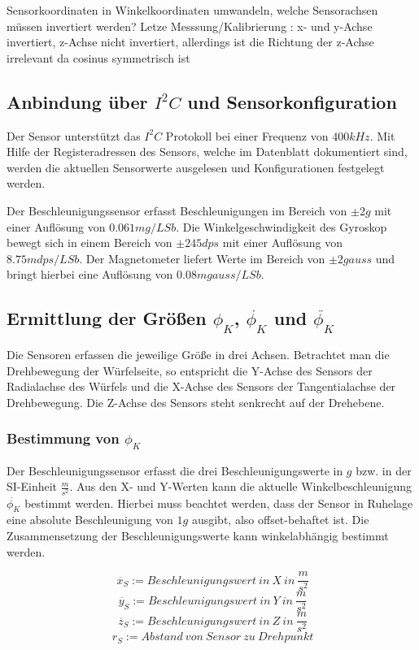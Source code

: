 \documentclass{article}
\begin{document}
Sensorkoordinaten in Winkelkoordinaten umwandeln, welche Sensorachsen müssen invertiert werden?
Letze Messsung/Kalibrierung : x- und y-Achse invertiert, z-Achse nicht invertiert, allerdings ist die Richtung der z-Achse irrelevant da cosinus symmetrisch ist

\subsection{Anbindung über $I^2C$ und Sensorkonfiguration}
Der Sensor unterstützt das $I^2C$ Protokoll bei einer Frequenz von $400k Hz$. Mit Hilfe der Registeradressen des Sensors, welche im Datenblatt dokumentiert sind, werden die aktuellen Sensorwerte ausgelesen und Konfigurationen festgelegt werden.

Der Beschleunigungssensor erfasst Beschleunigungen im Bereich von $\pm2 g$ mit einer Auflösung von $0.061 mg / LSb$. Die Winkelgeschwindigkeit des Gyroskop bewegt sich in einem Bereich von $\pm 245 dps$ mit einer Auflösung von $8.75 mdps / LSb$. Der Magnetometer liefert Werte im Bereich von $\pm 2gauss$ und bringt hierbei eine Auflösung von $0.08 mgauss / LSb$.

\subsection{Ermittlung der Größen $\phi_K$, $\dot{\phi_K}$ und $\ddot{\phi_K}$}
Die Sensoren erfassen die jeweilige Größe in drei Achsen. Betrachtet man die Drehbewegung der Würfelseite, so entspricht die Y-Achse des Sensors der Radialachse des Würfels und die X-Achse des Sensors der Tangentialachse der Drehbewegung. Die Z-Achse des Sensors steht senkrecht auf der Drehebene.

\subsubsection{Bestimmung von $\phi_K$}
Der Beschleunigungssensor erfasst die drei Beschleunigungswerte in $g$ bzw. in der SI-Einheit $\frac{m}{s^2}$. Aus den X- und Y-Werten kann die aktuelle Winkelbeschleunigung $\ddot{\phi_K}$ bestimmt werden. Hierbei muss beachtet werden, dass der Sensor in Ruhelage eine absolute Beschleunigung von $1g$ ausgibt, also offset-behaftet ist. Die Zusammensetzung der Beschleunigungswerte kann winkelabhängig bestimmt werden.

\[\ \ddot{x_S} := Beschleunigungswert \ in \ X \ in \ \frac{m}{s^2} \]
\[\ \ddot{y_S} := Beschleunigungswert \ in \ Y \ in \ \frac{m}{s^2} \]
\[\ \ddot{z_S} := Beschleunigungswert \ in \ Z \ in \ \frac{m}{s^2} \]
\[\ r_S := Abstand \ von  \ Sensor \ zu \ Drehpunkt \]
\end{document}
